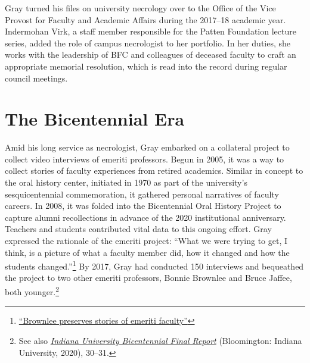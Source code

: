 \documentclass[
  american,
  letterpaper,
]{scrreprt}
\begin{document}
Gray turned his files on university necrology over to the Office of the
Vice Provost for Faculty and Academic Affairs during the 2017--18
academic year. Indermohan Virk, a staff member responsible for the
Patten Foundation lecture series, added the role of campus necrologist
to her portfolio. In her duties, she works with the leadership of BFC
and colleagues of deceased faculty to craft an appropriate memorial
resolution, which is read into the record during regular council
meetings.

\section{The Bicentennial Era}\label{the-bicentennial-era-1}

Amid his long service as necrologist, Gray embarked on a collateral
project to collect video interviews of emeriti professors. Begun in
2005, it was a way to collect stories of faculty experiences from
retired academics. Similar in concept to the oral history center,
initiated in 1970 as part of the university's sesquicentennial
commemoration, it gathered personal narratives of faculty careers. In
2008, it was folded into the Bicentennial Oral History Project to
capture alumni recollections in advance of the 2020 institutional
anniversary. Teachers and students contributed vital data to this
ongoing effort. Gray expressed the rationale of the emeriti project:
``What we were trying to get, I think, is a picture of what a faculty
member did, how it changed and how the students changed.''\footnote{\href{https://mediaschool.indiana.edu/news-events/news/item.html?n=brownlee-preserves-stories-of-emeriti-faculty}{``Brownlee
  preserves stories of emeriti faculty''}} By 2017, Gray had conducted
150 interviews and bequeathed the project to two other emeriti
professors, Bonnie Brownlee and Bruce Jaffee, both younger.\footnote{See
  also
  \href{https://web.archive.org/web/20230413202919/https://200.iu.edu/doc/IU-bicentennial-final.pdf}{\emph{Indiana
  University Bicentennial Final Report}} (Bloomington: Indiana
  University, 2020), 30--31.}
\end{document}
